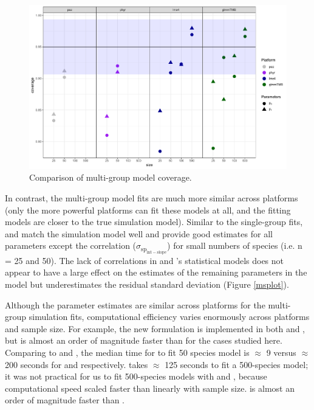 \documentclass[12pt]{article}
\begin{document}
\begin{center}
\begin{figure}[H]
  \includegraphics[scale=0.5]{./figure/mscoverage.pdf}
  \caption{Comparison of multi-group model coverage.}
  \label{msplot_coverage}
\end{figure}
\end{center}

In contrast, the multi-group model fits are much more similar across platforms (only the more powerful platforms can fit these models at all, and the fitting models are closer to the true simulation model).
Similar to the single-group fits,  and  match the simulation model well and provide good estimates for all parameters except the correlation ($\sigma_{\mathrm{sp_{int-slope}}}$) for small numbers of species (i.e. n = 25 and 50).
The lack of correlations in  and 's statistical models does not appear to have a large effect on the estimates of the remaining parameters in the model but underestimates the residual standard deviation (Figure \ref{msplot}).

Although the parameter estimates are similar across platforms for the multi-group simulation fits, computational efficiency varies enormously across platforms and sample size.
For example, the new formulation is implemented in both  and , but  is almost an order of magnitude faster than  for the cases studied here.
Comparing  to  and , the median time for  to fit 50 species model is $\approx$ 9 versus $\approx$ 200 seconds for  and  respectively. 
 takes $\approx$ 125 seconds to fit a 500-species model; it was not practical for us to fit 500-species models with  and , because computational speed scaled faster than linearly with sample size.
 is almost an order of magnitude faster than .
\end{document}
